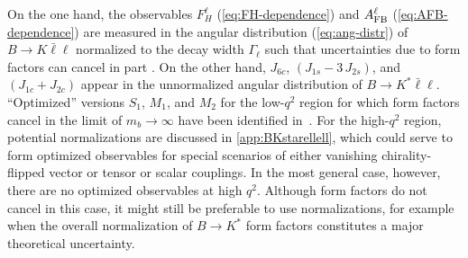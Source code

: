 \documentclass[twocolumn,epjc3]{svjour3}
\numberwithin{equation}{section}
\def \refeq#1{(\ref{#1})}
\def \refapp#1{\ref{#1}}
\renewcommand{\[}{\big[}
\renewcommand{\]}{\big]}
\renewcommand{\(}{\big(}
\renewcommand{\)}{\big)}
\begin{document}
On the one hand, the observables $F_H^\ell$ \refeq{eq:FH-dependence} and $A_{\rm
  FB}^\ell$ \refeq{eq:AFB-dependence} are measured in the angular distribution
\refeq{eq:ang-distr} of $B\to K \bar\ell\ell$ normalized to the decay width
$\Gamma_\ell$ such that uncertainties due to form factors can cancel in part
\cite{Bobeth:2007dw, Bobeth:2012vn}. On the other hand, $J_{6c}$, $(J_{1s} - 3\,
J_{2s})$, and $(J_{1c} + J_{2c})$ appear in the unnormalized angular
distribution of $B\to K^* \bar\ell\ell$. ``Optimized'' versions $S_1$, $M_1$,
and $M_2$ for the low-$q^2$ region for which form factors cancel in the limit of
$m_b \to \infty$ have been identified in~\cite{Matias:2012xw}.  For the
high-$q^2$ region, potential normalizations are discussed in
\refapp{app:BKstarellell}, which could serve to form optimized observables for
special scenarios of either vanishing chirality-flipped vector or tensor or
scalar couplings. In the most general case, however, there are no optimized
observables at high $q^2$. Although form factors do not cancel in this case, it
might still be preferable to use normalizations, for example when the overall
normalization of $B\to K^*$ form factors constitutes a major theoretical
uncertainty.
\end{document}
